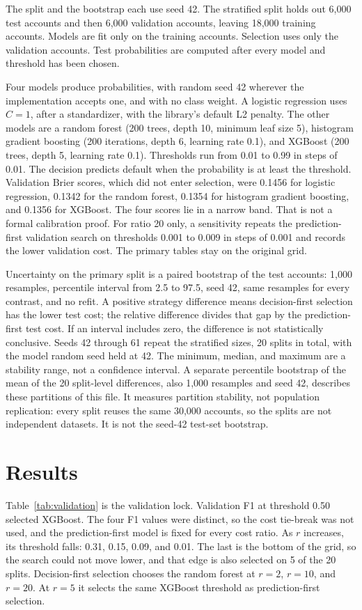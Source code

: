 \documentclass[12pt]{article}
\begin{document}
The split and the bootstrap each use seed 42. The stratified split holds out 6,000 test accounts and then 6,000 validation accounts, leaving 18,000 training accounts. Models are fit only on the training accounts. Selection uses only the validation accounts. Test probabilities are computed after every model and threshold has been chosen.

Four models produce probabilities, with random seed 42 wherever the implementation accepts one, and with no class weight. A logistic regression uses $C = 1$, after a standardizer, with the library's default L2 penalty. The other models are a random forest (200 trees, depth 10, minimum leaf size 5), histogram gradient boosting (200 iterations, depth 6, learning rate 0.1), and XGBoost (200 trees, depth 5, learning rate 0.1). Thresholds run from 0.01 to 0.99 in steps of 0.01. The decision predicts default when the probability is at least the threshold. Validation Brier scores, which did not enter selection, were 0.1456 for logistic regression, 0.1342 for the random forest, 0.1354 for histogram gradient boosting, and 0.1356 for XGBoost. The four scores lie in a narrow band. That is not a formal calibration proof. For ratio 20 only, a sensitivity repeats the prediction-first validation search on thresholds 0.001 to 0.009 in steps of 0.001 and records the lower validation cost. The primary tables stay on the original grid.

Uncertainty on the primary split is a paired bootstrap of the test accounts: 1,000 resamples, percentile interval from 2.5 to 97.5, seed 42, same resamples for every contrast, and no refit. A positive strategy difference means decision-first selection has the lower test cost; the relative difference divides that gap by the prediction-first test cost. If an interval includes zero, the difference is not statistically conclusive. Seeds 42 through 61 repeat the stratified sizes, 20 splits in total, with the model random seed held at 42. The minimum, median, and maximum are a stability range, not a confidence interval. A separate percentile bootstrap of the mean of the 20 split-level differences, also 1,000 resamples and seed 42, describes these partitions of this file. It measures partition stability, not population replication: every split reuses the same 30,000 accounts, so the splits are not independent datasets. It is not the seed-42 test-set bootstrap.

\section{Results}
\label{sec:results}
Table~\ref{tab:validation} is the validation lock. Validation F1 at threshold 0.50 selected XGBoost. The four F1 values were distinct, so the cost tie-break was not used, and the prediction-first model is fixed for every cost ratio. As \(r\) increases, its threshold falls: 0.31, 0.15, 0.09, and 0.01. The last is the bottom of the grid, so the search could not move lower, and that edge is also selected on 5 of the 20 splits. Decision-first selection chooses the random forest at \(r=2\), \(r=10\), and \(r=20\). At \(r=5\) it selects the same XGBoost threshold as prediction-first selection.
\end{document}
